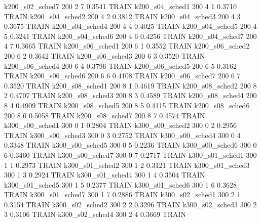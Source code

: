   k200_s02_sched7                  200    2   7    0.3541  TRAIN
  k200_s04_sched1                  200    4   1    0.3710  TRAIN
  k200_s04_sched2                  200    4   2    0.3812  TRAIN
  k200_s04_sched3                  200    4   3    0.3675  TRAIN
  k200_s04_sched4                  200    4   4    0.4025  TRAIN
  k200_s04_sched5                  200    4   5    0.3241  TRAIN
  k200_s04_sched6                  200    4   6    0.4256  TRAIN
  k200_s04_sched7                  200    4   7    0.3665  TRAIN
  k200_s06_sched1                  200    6   1    0.3552  TRAIN
  k200_s06_sched2                  200    6   2    0.3642  TRAIN
  k200_s06_sched3                  200    6   3    0.3520  TRAIN
  k200_s06_sched4                  200    6   4    0.3796  TRAIN
  k200_s06_sched5                  200    6   5    0.3162  TRAIN
  k200_s06_sched6                  200    6   6    0.4108  TRAIN
  k200_s06_sched7                  200    6   7    0.3520  TRAIN
  k200_s08_sched1                  200    8   1    0.4619  TRAIN
  k200_s08_sched2                  200    8   2    0.4707  TRAIN
  k200_s08_sched3                  200    8   3    0.4589  TRAIN
  k200_s08_sched4                  200    8   4    0.4909  TRAIN
  k200_s08_sched5                  200    8   5    0.4115  TRAIN
  k200_s08_sched6                  200    8   6    0.5058  TRAIN
  k200_s08_sched7                  200    8   7    0.4574  TRAIN
  k300_s00_sched1                  300    0   1    0.2804  TRAIN
  k300_s00_sched2                  300    0   2    0.2956  TRAIN
  k300_s00_sched3                  300    0   3    0.2752  TRAIN
  k300_s00_sched4                  300    0   4    0.3348  TRAIN
  k300_s00_sched5                  300    0   5    0.2236  TRAIN
  k300_s00_sched6                  300    0   6    0.3460  TRAIN
  k300_s00_sched7                  300    0   7    0.2717  TRAIN
  k300_s01_sched1                  300    1   1    0.2973  TRAIN
  k300_s01_sched2                  300    1   2    0.3121  TRAIN
  k300_s01_sched3                  300    1   3    0.2924  TRAIN
  k300_s01_sched4                  300    1   4    0.3504  TRAIN
  k300_s01_sched5                  300    1   5    0.2377  TRAIN
  k300_s01_sched6                  300    1   6    0.3628  TRAIN
  k300_s01_sched7                  300    1   7    0.2886  TRAIN
  k300_s02_sched1                  300    2   1    0.3154  TRAIN
  k300_s02_sched2                  300    2   2    0.3296  TRAIN
  k300_s02_sched3                  300    2   3    0.3106  TRAIN
  k300_s02_sched4                  300    2   4    0.3669  TRAIN
